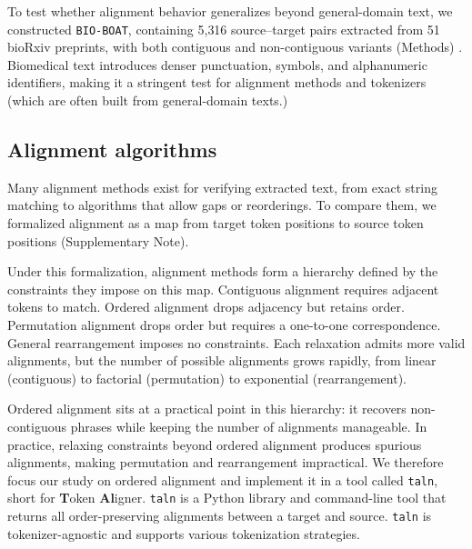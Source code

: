 \documentclass[10pt,twocolumn]{article}
\theoremstyle{plain}
\theoremstyle{definition}
\theoremstyle{remark}
\begin{document}
To test whether alignment behavior generalizes beyond general-domain text, we constructed \texttt{BIO-BOAT}, containing 5{,}316 source–target pairs extracted from 51 bioRxiv preprints, with both contiguous and non-contiguous variants (Methods) \citep{van_Vliet_2022,Cobo_L_pez_2023,Meyer_2023,Zimyanin_2023,Singer_2024,Shen_2024,Frolov_2024,Ryan_2024,Pfalzgraf_2024,Onishi_2024,Wondim_2024,Crnkovic_2024,Kallenborn_2024,Peroutka_Bigus_2024,Azim_2024,Bhalla_2024,Jones_2024,Fei_2024,Combredet_2024,Simmonds_2025,Adhinarta_2025,Elangovan_2025,Tang_2025,Maya_Miles_2025,Samame_Caramutti_2025,Nguyen_2025,Terstege_2025,Chen_2025_biorxiv,Li_2025,Kattner_2025,Shruti_2025,Vel_zquez_2025,Rull_2025,D_lker_2025,Keikhosravi_2025,Agazzi_2025,Choltus_2025,Maestro_2025,Widney_2025,Smith_2025,Mar_n_2025,Dadonaite_2025,Green_2025,S_lzen_2025,Pearce_2025,Biller_2025,Laub_2025,Johnson_2025,Na_2025,Tozzi_2025}. Biomedical text introduces denser punctuation, symbols, and alphanumeric identifiers, making it a stringent test for alignment methods and tokenizers (which are often built from general-domain texts.)

\subsection{Alignment algorithms}
Many alignment methods exist for verifying extracted text, from exact string matching to algorithms that allow gaps or reorderings. To compare them, we formalized alignment as a map from target token positions to source token positions (Supplementary Note).

Under this formalization, alignment methods form a hierarchy defined by the constraints they impose on this map. Contiguous alignment requires adjacent tokens to match. Ordered alignment drops adjacency but retains order. Permutation alignment drops order but requires a one-to-one correspondence. General rearrangement imposes no constraints. Each relaxation admits more valid alignments, but the number of possible alignments grows rapidly, from linear (contiguous) to factorial (permutation) to exponential (rearrangement).

Ordered alignment sits at a practical point in this hierarchy: it recovers non-contiguous phrases while keeping the number of alignments manageable. In practice, relaxing constraints beyond ordered alignment produces spurious alignments, making permutation and rearrangement impractical. We therefore focus our study on ordered alignment and implement it in a tool called \texttt{taln}, short for \textbf{T}oken \textbf{Al}igner. \texttt{taln} is a Python library and command-line tool that returns all order-preserving alignments between a target and source. \texttt{taln} is tokenizer-agnostic and supports various tokenization strategies. 
\end{document}
